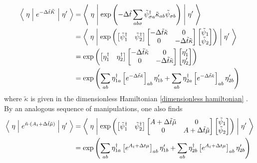 \begin{align}
		\left\langle\;\eta\;\middle|\; e^{-\Delta \tilde{t} \tilde{K}} \;\middle|\;\eta'\;\right\rangle
	&= 
		\left\langle\;\eta\;\middle|\; \exp\left(-\Delta \tilde{t} \sum_{ab \sigma} \tilde{\psi}^{\dagger}_{\sigma a} \tilde{\kappa}_{ab} \tilde{\psi}_{\sigma b} \right)\;\middle|\;\eta'\;\right\rangle
	\nonumber\\
	&=
		\left\langle\;\eta\;\middle|\; \exp\left(
			\begin{bmatrix} \tilde{\psi}^{\dagger}_{1} &  \tilde{\psi}^{\dagger}_{2}  \end{bmatrix} 
			\begin{bmatrix}
				-\Delta \tilde{t} \tilde{\kappa}	& 0 \\
				0 									& -\Delta \tilde{t} \tilde{\kappa} 
			\end{bmatrix} 
			\begin{bmatrix} \tilde{\psi}_{1} \\  \tilde{\psi}_{2}  \end{bmatrix}
		\right) \;\middle|\;\eta'\;\right\rangle
	\nonumber\\
	& = 
		\exp\left( 
			\begin{bmatrix} {\eta}^{\dagger}_{1} &  {\eta}^{\dagger}_{2}  \end{bmatrix} 
			\begin{bmatrix}
				-\Delta \tilde{t} \tilde{\kappa}	& 0 \\
				0 									& -\Delta \tilde{t} \tilde{\kappa} 
			\end{bmatrix} 
			\begin{bmatrix} {\eta}_{1}' \\  {\eta}_{2}'  \end{bmatrix}
		\right)
	\\
	& = 
		\exp\left( 
			\sum_{ab} \eta^{\dagger}_{1a} \left[e^{-\Delta \tilde{t} \tilde{\kappa}}\right]_{ab} \eta'_{1b}
		+	\sum_{ab} \eta^{\dagger}_{2a} \left[e^{-\Delta \tilde{t} \tilde{\kappa}}\right]_{ab} \eta'_{2b}
		\right)
\end{align}
where $\tilde{\kappa}$ is given in the dimensionless Hamiltonian \eqref{dimensionless hamiltonian} .
By an analogous sequence of manipulations, one also finds
\begin{align}
	\left\langle\;\eta\;\middle|\; e^{\tilde{n} \cdot (A_t + \Delta\tilde{t} \tilde{\mu})} \;\middle|\;\eta'\;\right\rangle
	&=
		\left\langle\;\eta\;\middle|\; \exp\left(
			\begin{bmatrix} \tilde{\psi}^{\dagger}_{1} &  \tilde{\psi}^{\dagger}_{2}  \end{bmatrix} 
			\begin{bmatrix}
				A + \Delta \tilde{t} \tilde{\mu}	& 0 \\
				0 									& A +\Delta \tilde{t} \tilde{\mu} 
			\end{bmatrix} 
			\begin{bmatrix} \tilde{\psi}_{1} \\  \tilde{\psi}_{2}  \end{bmatrix}
		\right) \;\middle|\;\eta'\;\right\rangle
	\label{eq:gaussian spinors}\\
	& = 
		\exp\left( 
			\sum_{ab}\eta^{\dagger}_{1a} \left[e^{A_t + \Delta t \mu}\right]_{ab} \eta'_{1b}
		+	\sum_{ab}\eta^{\dagger}_{2b} \left[e^{A_t + \Delta t \mu}\right]_{ab} \eta'_{2b}
		\right)
\end{align}
